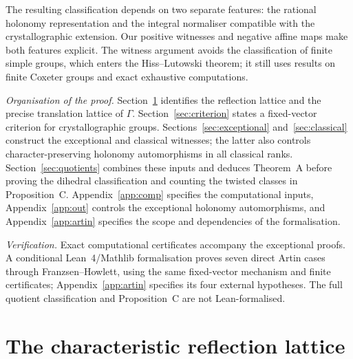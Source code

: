 \documentclass[11pt]{amsart}
\theoremstyle{definition}
\begin{document}
The resulting classification depends on two separate features: the rational holonomy representation
and the integral normaliser compatible with the crystallographic extension. Our positive witnesses
and negative affine maps make both features explicit. The witness argument avoids the classification
of finite simple groups, which enters the Hiss--Lutowski theorem; it still uses results on finite Coxeter
groups and exact exhaustive computations.

\smallskip\noindent\emph{Organisation of the proof.}
Section~\ref{sec:lattice} identifies the reflection lattice and the precise translation lattice of $\Gamma$.
Section~\ref{sec:criterion} states a fixed-vector criterion for crystallographic groups.
Sections~\ref{sec:exceptional} and~\ref{sec:classical} construct the exceptional and classical witnesses;
the latter also controls character-preserving holonomy automorphisms in all classical ranks.
Section~\ref{sec:quotients} combines these inputs and deduces Theorem~A before proving the dihedral classification
and counting the twisted classes in Proposition~C. Appendix~\ref{app:comp} specifies the computational inputs,
Appendix~\ref{app:out} controls the exceptional holonomy automorphisms, and Appendix~\ref{app:artin}
specifies the scope and dependencies of the formalisation.

\smallskip\noindent\emph{Verification.}
Exact computational certificates accompany the exceptional proofs. A conditional Lean~4/Mathlib
formalisation proves seven direct Artin cases through Franzsen--Howlett, using the same fixed-vector mechanism
and finite certificates; Appendix~\ref{app:artin} specifies its four external hypotheses.
The full quotient classification and Proposition~C are not Lean-formalised.

\section{The characteristic reflection lattice}\label{sec:lattice}
\end{document}
